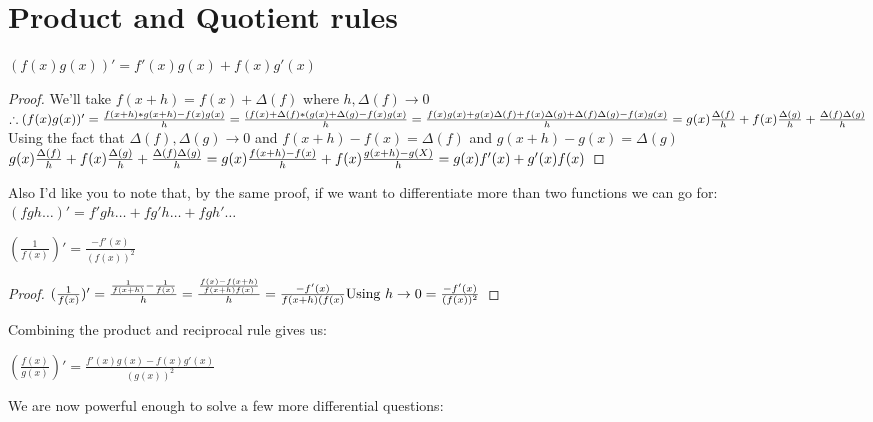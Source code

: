 \section{Product and Quotient rules}
\begin{theorem}
    $(f(x)g(x))'=f'(x)g(x)+f(x)g'(x)$
\end{theorem}
\begin{proof}
We'll take $f(x+h)=f(x)+\Delta(f)$ where $h,\Delta(f) \rightarrow 0$\\
    $\therefore (f(x)g(x))'=\frac{f(x+h)*g(x+h)-f(x)g(x)}{h}\\
    = \frac{(f(x)+\Delta(f)*(g(x)+\Delta(g)-f(x)g(x)}{h}\\
    = \frac{f(x)g(x)+g(x)\Delta(f)+f(x)\Delta(g)+\Delta(f)\Delta(g)-f(x)g(x)}{h}\\
    = g(x)\frac{\Delta(f)}{h}+f(x)\frac{\Delta(g)}{h}+\frac{\Delta(f)\Delta(g)}{h}$\\
    Using the fact that $\Delta(f),\Delta(g) \rightarrow 0$ and $f(x+h)-f(x)=\Delta(f)$ and $g(x+h)-g(x)=\Delta(g)$\\
    $g(x)\frac{\Delta(f)}{h}+f(x)\frac{\Delta(g)}{h}+\frac{\Delta(f)\Delta(g)}{h}\\
    = g(x)\frac{f(x+h)-f(x)}{h}+f(x)\frac{g(x+h)-g(X)}{h}\\
    =g(x)f'(x)+g'(x)f(x)$
\end{proof}
Also I'd like you to note that, by the same proof, if we want to differentiate more than two functions we can go for: $(fgh\dots)'=f'gh\dots+fg'h\dots+fgh'\dots$\\
\begin{theorem}
    $(\frac{1}{f(x)})'=\frac{-f'(x)}{(f(x))^2}$
\end{theorem}
\begin{proof}
    $(\frac{1}{f(x)})'=\frac{\frac{1}{f(x+h)}-\frac{1}{f(x)}}{h}\\
    =\frac{\frac{f(x)-f(x+h)}{f(x+h)f(x)}}{h}\\
    =\frac{-f'(x)}{f(x+h)(f(x)} \text{Using } h \rightarrow 0\\
    =\frac{-f'(x)}{(f(x))^2}$
\end{proof}
Combining the product and reciprocal rule gives us:\\
\begin{theorem}
    $(\frac{f(x)}{g(x)})'=\frac{f'(x)g(x)-f(x)g'(x)}{(g(x))^2}$
\end{theorem}
We are now powerful enough to solve a few more differential questions:\\
